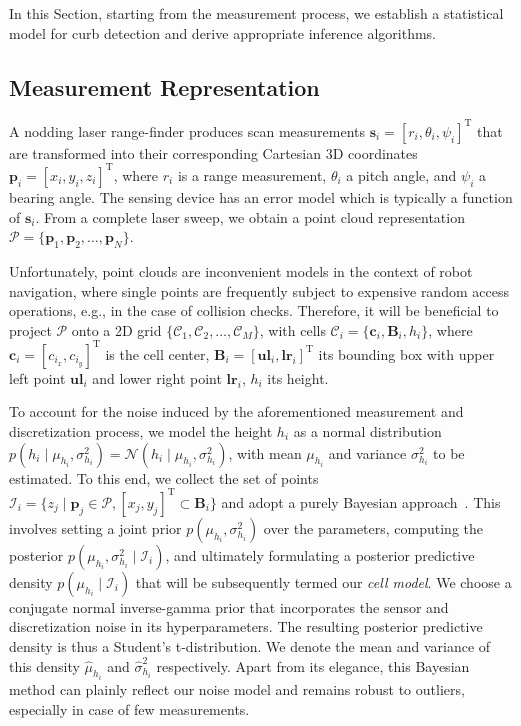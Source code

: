 In this Section, starting from the measurement process, we establish a
statistical model for curb detection and derive appropriate inference
algorithms.

\subsection{Measurement Representation}

A nodding laser range-finder produces scan measurements $\mathbf{s}_i=[r_i,
\theta_i,\psi_i]^\text{T}$ that are transformed into their corresponding
Cartesian 3D coordinates $\mathbf{p}_i=[x_i,y_i,z_i]^\text{T}$, where $r_i$ is
a range measurement, $\theta_i$ a pitch angle, and $\psi_i$ a bearing angle. The
sensing device has an error model which is typically a function of
$\mathbf{s}_i$. From a complete laser sweep, we obtain a point cloud
representation $\mathcal{P}=\{\mathbf{p}_1,\mathbf{p}_2,\dots,\mathbf{p}_N\}$.

Unfortunately, point clouds are inconvenient models in the context of robot
navigation, where single points are frequently subject to expensive random
access operations, e.g., in the case of collision checks. Therefore, it will be
beneficial to project $\mathcal{P}$ onto a 2D grid
$\{\mathcal{C}_1,\mathcal{C}_2,\dots,\mathcal{C}_M\}$, with cells
$\mathcal{C}_i=\{\mathbf{c}_i,\mathbf{B}_i,h_i\}$, where
$\mathbf{c}_i=[c_{i_x},c_{i_y}]^\text{T}$ is the cell center,
$\mathbf{B}_i=[\mathbf{ul}_i, \mathbf{lr}_i]^\text{T}$ its bounding box with
upper left point $\mathbf{ul}_i$ and lower right point $\mathbf{lr}_i$, $h_i$
its height.

To account for the noise induced by the aforementioned measurement and
discretization process, we model the height $h_i$ as a normal distribution
$p(h_i\mid\mu_{h_i},\sigma^2_{h_i})=\mathcal{N}(h_i\mid\mu_{h_i},
\sigma^2_{h_i})$, with mean $\mu_{h_i}$ and variance $\sigma^2_{h_i}$ to be
estimated. To this end, we collect the set of points $\mathcal{I}_i=\{z_j\mid
\mathbf{p}_j\in\mathcal{P}, [x_j,y_j]^\text{T}\subset\mathbf{B}_i\}$ and adopt a
purely Bayesian approach~\cite{gelman03bayesian}. This involves setting a joint
prior $p(\mu_{h_i},\sigma^2_{h_i})$ over the parameters, computing the
posterior $p(\mu_{h_i},\sigma^2_{h_i}\mid\mathcal{I}_i)$, and ultimately
formulating a posterior predictive density $p(\mu_{h_i}\mid\mathcal{I}_i)$ that
will be subsequently termed our \emph{cell model}. We choose a conjugate
normal inverse-gamma prior that incorporates the sensor and discretization noise
in its hyperparameters. The resulting posterior predictive density is thus a
Student's t-distribution. We denote the mean and variance of this density
$\hat{\mu}_{h_i}$ and $\hat{\sigma}^2_{h_i}$ respectively. Apart from its
elegance, this Bayesian method can plainly reflect our noise model and remains
robust to outliers, especially in case of few measurements.

